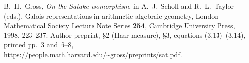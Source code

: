 B.~H.~Gross, \emph{On the Satake isomorphism}, in A.~J.~Scholl and
R.~L.~Taylor (eds.), Galois representations in arithmetic algebraic
geometry, London Mathematical Society Lecture Note Series \textbf{254},
Cambridge University Press, 1998, 223--237.
Author preprint, \S2 (Haar measure), \S3, equations (3.13)--(3.14),
printed pp.~3 and~6--8,
\url{https://people.math.harvard.edu/~gross/preprints/sat.pdf}.
